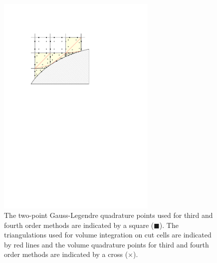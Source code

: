 \begin{figure}
	\begin{center}
		\includegraphics[width=3.0in]{figs/example_ccmesh_ho_vquad.pdf}
		\caption{\sf 
			The two-point Gauss-Legendre quadrature points used for third and fourth order methods are indicated by a square ($\blacksquare$).  The triangulations used for volume integration on cut cells are indicated by red lines and the volume quadrature points for third and fourth order methods are indicated by a cross ($\times$).} 
		\label{fig:2dfig_ho_vquad}
	\end{center}
\end{figure}


